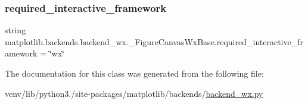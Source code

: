 \subsubsection{\texorpdfstring{required\+\_\+interactive\+\_\+framework}{required\_interactive\_framework}}
{\footnotesize\ttfamily string matplotlib.\+backends.\+backend\+\_\+wx.\+\_\+\+Figure\+Canvas\+Wx\+Base.\+required\+\_\+interactive\+\_\+framework = \char`\"{}wx\char`\"{}\hspace{0.3cm}{\ttfamily [static]}}



The documentation for this class was generated from the following file\+:\begin{DoxyCompactItemize}
\item 
venv/lib/python3./site-\/packages/matplotlib/backends/\hyperlink{backend__wx_8py}{backend\+\_\+wx.\+py}\end{DoxyCompactItemize}
